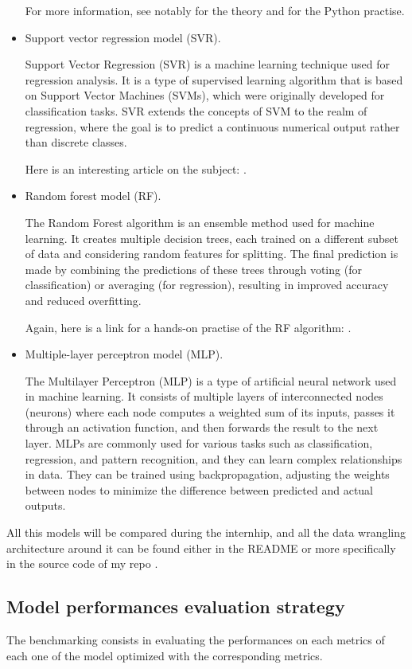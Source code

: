 \begin{itemize}
For more information, see notably \cite{GBMbasis} for the theory and \cite{GBMpractise} for the Python practise.
    \item Support vector regression model (SVR).

Support Vector Regression (SVR) is a machine learning technique used for regression analysis. It is a type of supervised learning algorithm that is based on Support Vector Machines (SVMs), which were originally developed for classification tasks. SVR extends the concepts of SVM to the realm of regression, where the goal is to predict a continuous numerical output rather than discrete classes.

    Here is an interesting article on the subject: \cite{SVR}.
    \item Random forest model (RF).

    The Random Forest algorithm is an ensemble method used for machine learning. It creates multiple decision trees, each trained on a different subset of data and considering random features for splitting. The final prediction is made by combining the predictions of these trees through voting (for classification) or averaging (for regression), resulting in improved accuracy and reduced overfitting.

Again, here is a link for a hands-on practise of the RF algorithm: \cite{RF}.
    \item Multiple-layer perceptron model (MLP).

The Multilayer Perceptron (MLP) is a type of artificial neural network used in machine learning. It consists of multiple layers of interconnected nodes (neurons) where each node computes a weighted sum of its inputs, passes it through an activation function, and then forwards the result to the next layer. MLPs are commonly used for various tasks such as classification, regression, and pattern recognition, and they can learn complex relationships in data. They can be trained using backpropagation, adjusting the weights between nodes to minimize the difference between predicted and actual outputs.

\end{itemize}
All this models will be compared during the internhip, and all the data wrangling architecture around it can be found either in the README or more specifically in the source code of my repo \cite{myrepo}.

\subsection{Model performances evaluation strategy}
The benchmarking consists in evaluating the performances on each metrics of each one of the model optimized with the corresponding metrics.

